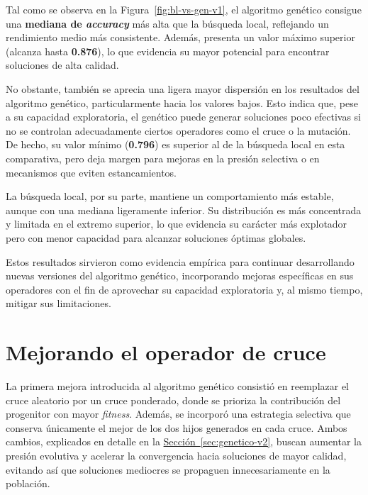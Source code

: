 Tal como se observa en la Figura~\ref{fig:bl-vs-gen-v1}, el algoritmo genético consigue una \textbf{mediana de \textit{accuracy}} más alta que la búsqueda local,
reflejando un rendimiento medio más consistente.
Además, presenta un valor máximo superior (alcanza hasta \textbf{0.876}), lo que evidencia su mayor potencial para encontrar soluciones de alta calidad.

No obstante, también se aprecia una ligera mayor dispersión en los resultados del algoritmo genético, particularmente hacia los valores bajos.
Esto indica que, pese a su capacidad exploratoria, el genético puede generar soluciones poco efectivas si no se controlan adecuadamente ciertos operadores como el cruce o la mutación.
De hecho, su valor mínimo (\textbf{0.796}) es superior al de la búsqueda local en esta comparativa, pero deja margen para mejoras en la presión selectiva o en mecanismos que eviten estancamientos.

La búsqueda local, por su parte, mantiene un comportamiento más estable, aunque con una mediana ligeramente inferior.
Su distribución es más concentrada y limitada en el extremo superior, lo que evidencia su carácter más explotador pero con menor capacidad para alcanzar soluciones óptimas globales.

Estos resultados sirvieron como evidencia empírica para continuar desarrollando nuevas versiones del algoritmo genético,
incorporando mejoras específicas en sus operadores con el fin de aprovechar su capacidad exploratoria y, al mismo tiempo, mitigar sus limitaciones.

\section{Mejorando el operador de cruce}\label{sec:incorporacion-cruce}
La primera mejora introducida al algoritmo genético consistió en reemplazar el cruce aleatorio por un cruce ponderado,
donde se prioriza la contribución del progenitor con mayor \textit{fitness}.
Además, se incorporó una estrategia selectiva que conserva únicamente el mejor de los dos hijos generados en cada cruce.
Ambos cambios, explicados en detalle en la \hyperref[sec:genetico-v2]{Sección~\ref*{sec:genetico-v2}},
buscan aumentar la presión evolutiva y acelerar la convergencia hacia soluciones de mayor calidad,
evitando así que soluciones mediocres se propaguen innecesariamente en la población.

